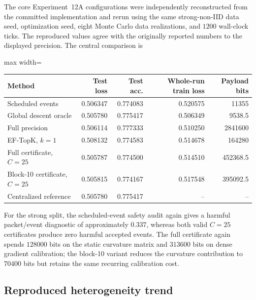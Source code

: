 The core Experiment~12A configurations were independently reconstructed from the committed implementation and rerun using the same strong-non-IID data seed, optimization seed, eight Monte Carlo data realizations, and $1200$ wall-clock ticks. The reproduced values agree with the originally reported numbers to the displayed precision. The central comparison is
\begin{center}
\begin{adjustbox}{max width=\textwidth}
\begin{tabular}{lrrrr}
\toprule
Method & Test loss & Test acc. & Whole-run train loss & Payload bits\\
\midrule
Scheduled events & 0.506347 & 0.774083 & 0.520575 & 11355\\
Global descent oracle & 0.505780 & 0.775417 & 0.506349 & 9538.5\\
Full precision & 0.506114 & 0.777333 & 0.510250 & 2841600\\
EF-TopK, $k=1$ & 0.508132 & 0.774583 & 0.514678 & 164280\\
Full certificate, $C=25$ & 0.505787 & 0.774500 & 0.514510 & 452368.5\\
Block-10 certificate, $C=25$ & 0.505815 & 0.774167 & 0.517548 & 395092.5\\
Centralized reference & 0.505780 & 0.775417 & -- & --\\
\bottomrule
\end{tabular}
\end{adjustbox}
\end{center}
For the strong split, the scheduled-event safety audit again gives a harmful packet/event diagnostic of approximately $0.337$, whereas both valid $C=25$ certificates produce zero harmful accepted events. The full certificate again spends $128000$ bits on the static curvature matrix and $313600$ bits on dense gradient calibration; the block-10 variant reduces the curvature contribution to $70400$ bits but retains the same recurring calibration cost.

\subsection{Reproduced heterogeneity trend}

